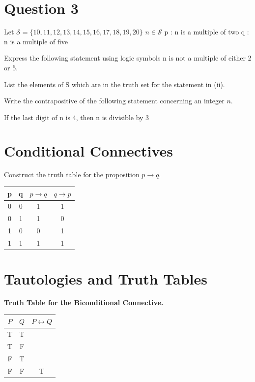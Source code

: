 \documentclass[]{report}
\begin{document}
\begin{enumerate}
\section*{Question 3}

Let $\mathcal{S} = \{10,11,12,13,14,15,16,17,18,19,20\}$
$n  \in \mathcal{S}$
p : n is a multiple of two
q : n is a multiple of five

Express the following statement using logic symbols
n is not a multiple of either 2 or 5.

List the elements of S which are in the truth set for the statement in (ii).

Write the contrapositive of the following statement concerning an integer $n$.

If the last digit of n is 4, then n is divisible by 3

\section{Conditional Connectives}
Construct the truth table for the proposition $p \rightarrow q$.

\begin{center}
\begin{tabular}{|c|c|c|c|}
\hline
p & q & $p \rightarrow q$ & $q \rightarrow p$ \\
\hline
0 & 0 & 1& 1 \\
0 & 1 & 1 & 0 \\
1 & 0 & 0 & 1 \\
1 & 1 & 1 & 1 \\
\hline
\end{tabular}
\end{center}

\section{Tautologies and Truth Tables}
\textbf{Truth Table for the Biconditional Connective.} \bigskip
\begin{center}
\begin{tabular}{|c|c|c|}
\hline $P$  & $Q$ & $P \leftrightarrow Q$ \\ \hline
\hline T & T &   \\ 
\hline T & F &    \\ 
\hline F & T &    \\ 
\hline \phantom{sp}F \phantom{sp} & \phantom{sp}F \phantom{sp} & \phantom{sp}T \phantom{sp} \\
\hline 
\end{tabular} 
\end{center}


\end{enumerate}
\end{document}
